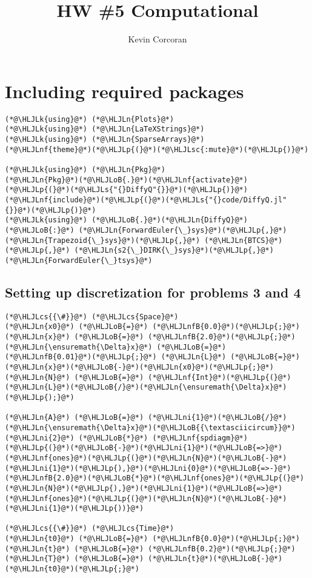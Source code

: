 \documentclass[12pt,a4paper]{article}
\title{ HW \#5 Computational }
\author{ Kevin Corcoran }
\newcommand{\HLJLk}[1]{\textcolor[RGB]{148,91,176}{\textbf{#1}}}
\newcommand{\HLJLn}[1]{#1}
\newcommand{\HLJLnf}[1]{\textcolor[RGB]{66,102,213}{#1}}
\newcommand{\HLJLs}[1]{\textcolor[RGB]{201,61,57}{#1}}
\newcommand{\HLJLsc}[1]{\textcolor[RGB]{201,61,57}{#1}}
\newcommand{\HLJLnfB}[1]{\textcolor[RGB]{59,151,46}{#1}}
\newcommand{\HLJLni}[1]{\textcolor[RGB]{59,151,46}{#1}}
\newcommand{\HLJLoB}[1]{\textcolor[RGB]{102,102,102}{\textbf{#1}}}
\newcommand{\HLJLp}[1]{#1}
\newcommand{\HLJLcs}[1]{\textcolor[RGB]{153,153,119}{\textit{#1}}}
\begin{document}
\maketitle

\section{Including required packages}

\begin{lstlisting}
(*@\HLJLk{using}@*) (*@\HLJLn{Plots}@*)
(*@\HLJLk{using}@*) (*@\HLJLn{LaTeXStrings}@*)
(*@\HLJLk{using}@*) (*@\HLJLn{SparseArrays}@*)
(*@\HLJLnf{theme}@*)(*@\HLJLp{(}@*)(*@\HLJLsc{:mute}@*)(*@\HLJLp{)}@*)

(*@\HLJLk{using}@*) (*@\HLJLn{Pkg}@*)
(*@\HLJLn{Pkg}@*)(*@\HLJLoB{.}@*)(*@\HLJLnf{activate}@*)(*@\HLJLp{(}@*)(*@\HLJLs{"{}DiffyQ"{}}@*)(*@\HLJLp{)}@*)
(*@\HLJLnf{include}@*)(*@\HLJLp{(}@*)(*@\HLJLs{"{}code/DiffyQ.jl"{}}@*)(*@\HLJLp{)}@*)
(*@\HLJLk{using}@*) (*@\HLJLoB{.}@*)(*@\HLJLn{DiffyQ}@*)(*@\HLJLoB{:}@*) (*@\HLJLn{ForwardEuler{\_}sys}@*)(*@\HLJLp{,}@*) (*@\HLJLn{Trapezoid{\_}sys}@*)(*@\HLJLp{,}@*) (*@\HLJLn{BTCS}@*)(*@\HLJLp{,}@*) (*@\HLJLn{s2{\_}DIRK{\_}sys}@*)(*@\HLJLp{,}@*) (*@\HLJLn{ForwardEuler{\_}tsys}@*)
\end{lstlisting}


\subsection{Setting up discretization for problems 3 and 4}

\begin{lstlisting}
(*@\HLJLcs{{\#}}@*) (*@\HLJLcs{Space}@*)
(*@\HLJLn{x0}@*) (*@\HLJLoB{=}@*) (*@\HLJLnfB{0.0}@*)(*@\HLJLp{;}@*) (*@\HLJLn{x}@*) (*@\HLJLoB{=}@*) (*@\HLJLnfB{2.0}@*)(*@\HLJLp{;}@*)
(*@\HLJLn{\ensuremath{\Delta}x}@*) (*@\HLJLoB{=}@*) (*@\HLJLnfB{0.01}@*)(*@\HLJLp{;}@*) (*@\HLJLn{L}@*) (*@\HLJLoB{=}@*) (*@\HLJLn{x}@*)(*@\HLJLoB{-}@*)(*@\HLJLn{x0}@*)(*@\HLJLp{;}@*) (*@\HLJLn{N}@*) (*@\HLJLoB{=}@*) (*@\HLJLnf{Int}@*)(*@\HLJLp{(}@*)(*@\HLJLn{L}@*)(*@\HLJLoB{/}@*)(*@\HLJLn{\ensuremath{\Delta}x}@*)(*@\HLJLp{);}@*) 

(*@\HLJLn{A}@*) (*@\HLJLoB{=}@*) (*@\HLJLni{1}@*)(*@\HLJLoB{/}@*)(*@\HLJLn{\ensuremath{\Delta}x}@*)(*@\HLJLoB{{\textasciicircum}}@*)(*@\HLJLni{2}@*) (*@\HLJLoB{*}@*) (*@\HLJLnf{spdiagm}@*)(*@\HLJLp{(}@*)(*@\HLJLoB{-}@*)(*@\HLJLni{1}@*)(*@\HLJLoB{=>}@*)(*@\HLJLnf{ones}@*)(*@\HLJLp{(}@*)(*@\HLJLn{N}@*)(*@\HLJLoB{-}@*)(*@\HLJLni{1}@*)(*@\HLJLp{),}@*)(*@\HLJLni{0}@*)(*@\HLJLoB{=>-}@*)(*@\HLJLnfB{2.0}@*)(*@\HLJLoB{*}@*)(*@\HLJLnf{ones}@*)(*@\HLJLp{(}@*)(*@\HLJLn{N}@*)(*@\HLJLp{),}@*)(*@\HLJLni{1}@*)(*@\HLJLoB{=>}@*)(*@\HLJLnf{ones}@*)(*@\HLJLp{(}@*)(*@\HLJLn{N}@*)(*@\HLJLoB{-}@*)(*@\HLJLni{1}@*)(*@\HLJLp{))}@*)

(*@\HLJLcs{{\#}}@*) (*@\HLJLcs{Time}@*)
(*@\HLJLn{t0}@*) (*@\HLJLoB{=}@*) (*@\HLJLnfB{0.0}@*)(*@\HLJLp{;}@*) (*@\HLJLn{t}@*) (*@\HLJLoB{=}@*) (*@\HLJLnfB{0.2}@*)(*@\HLJLp{;}@*) 
(*@\HLJLn{T}@*) (*@\HLJLoB{=}@*) (*@\HLJLn{t}@*)(*@\HLJLoB{-}@*)(*@\HLJLn{t0}@*)(*@\HLJLp{;}@*)
\end{lstlisting}
\end{document}

